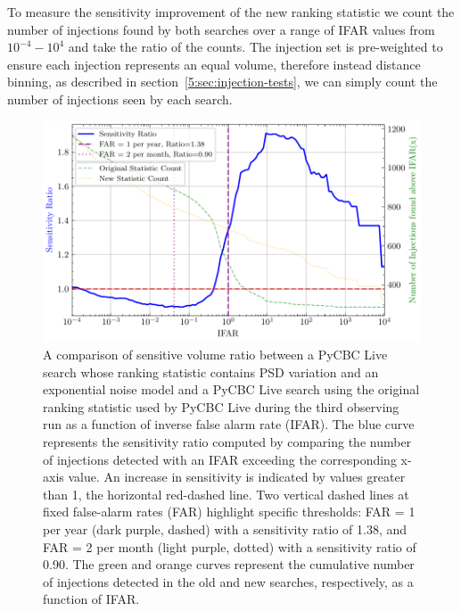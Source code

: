 
To measure the sensitivity improvement of the new ranking statistic we count the number of injections found by both searches over a range of IFAR values from $10^{-4} - 10^{4}$ and take the ratio of the counts. The injection set is pre-weighted to ensure each injection represents an equal volume, therefore instead distance binning, as described in section~\ref{5:sec:injection-tests}, we can simply count the number of injections seen by each search.
%
\begin{figure}
  \centering
  \begin{minipage}[t]{1.0\linewidth}
  
    \includegraphics[width=1.0\textwidth]{images/5_pycbclive/fits-psd/fits_psd_vt_ratio_with_counts.pdf}
    \caption{A comparison of sensitive volume ratio between a PyCBC Live search whose ranking statistic contains PSD variation and an exponential noise model and a PyCBC Live search using the original ranking statistic used by PyCBC Live during the third observing run as a function of inverse false alarm rate (IFAR). The blue curve represents the sensitivity ratio computed by comparing the number of injections detected with an IFAR exceeding the corresponding x-axis value. An increase in sensitivity is indicated by values greater than 1, the horizontal red-dashed line. Two vertical dashed lines at fixed false-alarm rates (FAR) highlight specific thresholds: FAR = 1 per year (dark purple, dashed) with a sensitivity ratio of 1.38, and FAR = 2 per month (light purple, dotted) with a sensitivity ratio of 0.90. The green and orange curves represent the cumulative number of injections detected in the old and new searches, respectively, as a function of IFAR.}
    \label{5:fig:fits-psdvar-sensitivity}

  \end{minipage}
\end{figure}
